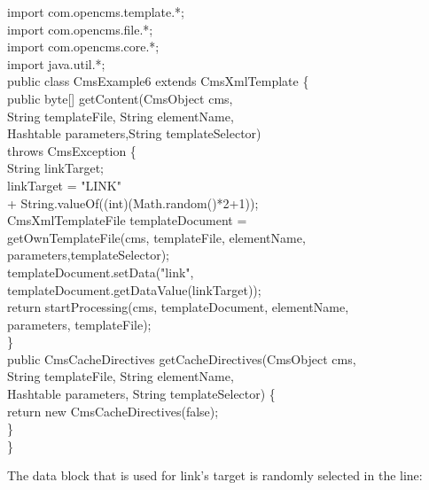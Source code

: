 \begin{java}
import com.opencms.template.*;\\
import com.opencms.file.*;\\
import com.opencms.core.*;\\
import java.util.*;\\[1ex]


public class CmsExample6 extends CmsXmlTemplate \{\\[1ex]

\jtaba public byte[] getContent(CmsObject cms,\\
\jtabc        String templateFile, String elementName,\\
\jtabc        Hashtable parameters,String templateSelector)\\
\jtabc        throws CmsException \{\\
\jtabb   String linkTarget;\\
\jtabb   linkTarget = "LINK"\\
\jtabd       + String.valueOf((int)(Math.random()*2+1));\\
\jtabb   CmsXmlTemplateFile templateDocument =\\
\jtabd       getOwnTemplateFile(cms, templateFile, elementName,\\
\jtabd       parameters,templateSelector);\\
\jtabb   templateDocument.setData("link",\\
\jtabd       templateDocument.getDataValue(linkTarget));\\
\jtabb   return startProcessing(cms, templateDocument, elementName,\\
\jtabd       parameters, templateFile);\\
\jtaba \}\\[1ex]

\jtaba public CmsCacheDirectives getCacheDirectives(CmsObject cms,\\
\jtabd     String templateFile, String elementName,\\
\jtabd   Hashtable parameters, String templateSelector) \{\\
\jtabb   return new CmsCacheDirectives(false);\\
\jtabb \}\\
\}\\
\end{java}

The data block that is used for link's target is randomly selected in
the line:

